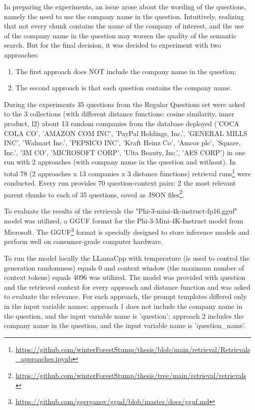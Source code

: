 In preparing the experiments, an issue arose about the wording of the questions, namely the need to use the company name in the question. Intuitively, realizing that not every chunk contains the name of the company of interest, and the use of the company name in the question may worsen the quality of the semantic search. But for the final decision, it was decided to experiment with two approaches:
\begin{enumerate}
\item The first approach does NOT include the company name in the question;
\item The second approach is that each question contains the company name.
\end{enumerate}

During the experiments 35 questions from the Regular Questions set were asked to the 3 collections (with different distance functions: cosine similarity, inner product, l2) about 13 random companies from the database deployed ('COCA COLA CO', 'AMAZON COM INC', 'PayPal Holdings, Inc.', 'GENERAL MILLS INC', 'Walmart Inc.', 'PEPSICO INC', 'Kraft Heinz Co', 'Amcor plc', 'Square, Inc.', '3M CO', 'MICROSOFT CORP', 'Ulta Beauty, Inc.', 'AES CORP') in one run with 2 approaches (with company name in the question and without). In total 78 (2 approaches x 13 companies x 3 distance functions) retrieval runs\footnote{\url{https://github.com/winterForestStump/thesis/blob/main/retrieval/Retrievals_approaches.ipynb}} were conducted. Every run provides 70 question-context pairs: 2 the most relevant parent chunks to each of 35 questions, saved as JSON files\footnote{\url{https://github.com/winterForestStump/thesis/tree/main/retrieval/retrievals}}.

To evaluate the results of the retrievals the "Phi-3-mini-4k-instruct-fp16.gguf" model was utilized, a GGUF format for the Phi-3-Mini-4K-Instruct model from Microsoft. The GGUF\footnote{\url{https://github.com/ggerganov/ggml/blob/master/docs/gguf.md}} format is specially designed to store inference models and perform well on consumer-grade computer hardware. 

To run the model locally the LLamaCpp with temperature (is used to control the generation randomness) equals 0 and context window (the maximum number of context tokens) equals 4096 was utilized. The model was provided with question and the retrieved context for every approach and distance function and was asked to evaluate the relevance. For each approach, the prompt templates differed only in the input variable names: approach 1 does not include the company name in the question, and the input variable name is 'question'; approach 2 includes the company name in the question, and the input variable name is 'question\_name'. 

